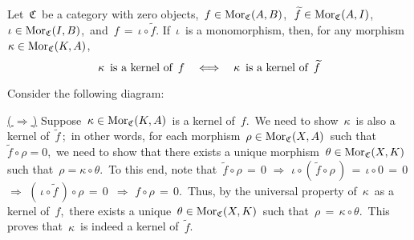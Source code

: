 \vskip 0.5cm
\begin{lemma}
\label{CompositionOnTheLeftByAMonomorphismPreservesKernels}
\mbox{}
\vskip 0.1cm
\noindent
Let \,$\mathfrak{C}$\, be a category with zero objects,
\,$f \in \textnormal{Mor}_{\mathfrak{C}}(A,B)$,\,
\,$\widetilde{f} \in \textnormal{Mor}_{\mathfrak{C}}(A,I)$,\,
\,$\iota \in \textnormal{Mor}_{\mathfrak{C}}(I,B)$,\,
and \,$f \,=\, \iota \circ \widetilde{f}$.
\vskip 0.1cm
\noindent
If \,$\iota$\, is a monomorphism, then, for any morphism \,$\kappa \in \textnormal{Mor}_{\mathfrak{C}}(K,A)$,
\begin{equation*}
\textnormal{$\kappa$\, is a kernel of \,$f$}
\quad\Longleftrightarrow\quad 
\textnormal{$\kappa$\, is a kernel of \,$\widetilde{f}$}
\end{equation*}
\end{lemma}
\proof
Consider the following diagram:
\begin{center}
\end{center}

\noindent
\underline{(\,$\Longrightarrow$\,)}\;\;
Suppose \,$\kappa \in \textnormal{Mor}_{\mathfrak{C}}(K,A)$\, is a kernel of \,$f$.\,
We need to show \,$\kappa$\, is also a kernel of \,$\widetilde{f}$\,;\,
in other words, for each morphism \,$\rho \in \textnormal{Mor}_{\mathfrak{C}}(X,A)$\, such that \,$\widetilde{f} \circ \rho = 0$,\,
we need to show that there exists a unique morphism \,$\theta \in \textnormal{Mor}_{\mathfrak{C}}(X,K)$\,
such that \,$\rho = \kappa \circ \theta$.\,
To this end, note that
\,$\widetilde{f} \circ \rho \,=\, 0$
\;\;$\Longrightarrow$\;\; $\iota \circ (\,\widetilde{f} \circ \rho\,) \,=\, \iota \circ 0 \,=\, 0$\,
\;\;$\Longrightarrow$\;\; $(\,\iota \circ \widetilde{f} \,) \circ \rho \,=\, 0$\,
\;\;$\Longrightarrow$\;\; $f \circ \rho \,=\, 0$.\,
Thus, by the universal property of \,$\kappa$\, as a kernel of \,$f$,\,
there exists a unique \,$\theta \in \textnormal{Mor}_{\mathfrak{C}}(X,K)$\,
such that \,$\rho \,=\, \kappa \circ \theta$.\,
This proves that \,$\kappa$\, is indeed a kernel of \,$\widetilde{f}$.

